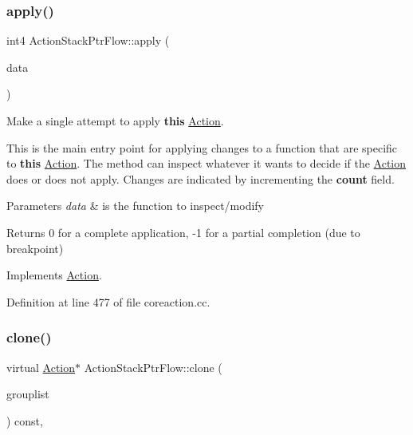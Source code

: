 \subsubsection{\texorpdfstring{apply()}{apply()}}
{\footnotesize\ttfamily int4 Action\+Stack\+Ptr\+Flow\+::apply (\begin{DoxyParamCaption}\item[{\mbox{\hyperlink{class_funcdata}{Funcdata}} \&}]{data }\end{DoxyParamCaption})\hspace{0.3cm}{\ttfamily [virtual]}}



Make a single attempt to apply {\bfseries{this}} \mbox{\hyperlink{class_action}{Action}}. 

This is the main entry point for applying changes to a function that are specific to {\bfseries{this}} \mbox{\hyperlink{class_action}{Action}}. The method can inspect whatever it wants to decide if the \mbox{\hyperlink{class_action}{Action}} does or does not apply. Changes are indicated by incrementing the {\bfseries{count}} field. 
\begin{DoxyParams}{Parameters}
{\em data} & is the function to inspect/modify \\
\hline
\end{DoxyParams}
\begin{DoxyReturn}{Returns}
0 for a complete application, -\/1 for a partial completion (due to breakpoint) 
\end{DoxyReturn}


Implements \mbox{\hyperlink{class_action_aac1c3999d6c685b15f5d9765a4d04173}{Action}}.



Definition at line 477 of file coreaction.\+cc.

\mbox{\label{class_action_stack_ptr_flow_a82a95a85172576abdfa446a3faed3ff4}} 
\subsubsection{\texorpdfstring{clone()}{clone()}}
{\footnotesize\ttfamily virtual \mbox{\hyperlink{class_action}{Action}}$\ast$ Action\+Stack\+Ptr\+Flow\+::clone (\begin{DoxyParamCaption}\item[{const \mbox{\hyperlink{class_action_group_list}{Action\+Group\+List}} \&}]{grouplist }\end{DoxyParamCaption}) const\hspace{0.3cm}{\ttfamily [inline]}, {\ttfamily [virtual]}}



